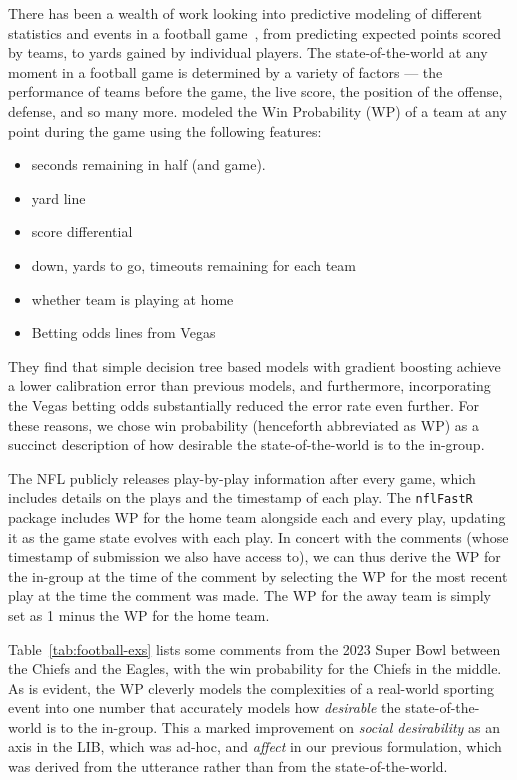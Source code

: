 There has been a wealth of work looking into predictive modeling of different statistics and events in a football game~\citep{horowitz2017nflscrapr, Yurko2018nflWARAR}, from predicting expected points scored by teams, to yards gained by individual players. The state-of-the-world at any moment in a football game is determined by a variety of factors --- the performance of teams before the game, the live score, the position of the offense, defense, and so many more. \citet{baldwin2021nflfastr} modeled the {Win Probability} (WP) of a team at any point during the game using the following features:

\begin{itemize}
    \item seconds remaining in half (and game).
    \item yard line
    \item score differential
    \item down, yards to go, timeouts remaining for each team
    \item whether team is playing at home
    \item Betting odds lines from Vegas
\end{itemize}

They find that simple decision tree based models with gradient boosting achieve a lower calibration error than previous models, and furthermore, incorporating the Vegas betting odds substantially reduced the error rate even further. For these reasons, we chose win probability (henceforth abbreviated as WP) as a succinct description of how desirable the state-of-the-world is to the in-group.

The NFL publicly releases play-by-play information after every game, which includes details on the plays and the timestamp of each play. The \texttt{nflFastR} package includes WP for the home team alongside each and every play, updating it as the game state evolves with each play. In concert with the comments (whose timestamp of submission we also have access to), we can thus derive the WP for the in-group at the time of the comment by selecting the WP for the most recent play at the time the comment was made. The WP for the away team is simply set as 1 minus the WP for the home team. 

Table~\ref{tab:football-exs} lists some comments from the 2023 Super Bowl between the Chiefs and the Eagles, with the win probability for the Chiefs in the middle. As is evident, the WP cleverly models the complexities of a real-world sporting event into one number that accurately models how \emph{desirable} the state-of-the-world is to the in-group. This a marked improvement on \emph{social desirability} as an axis in the LIB, which was ad-hoc, and \emph{affect} in our previous formulation, which was derived from the utterance rather than from the state-of-the-world.

